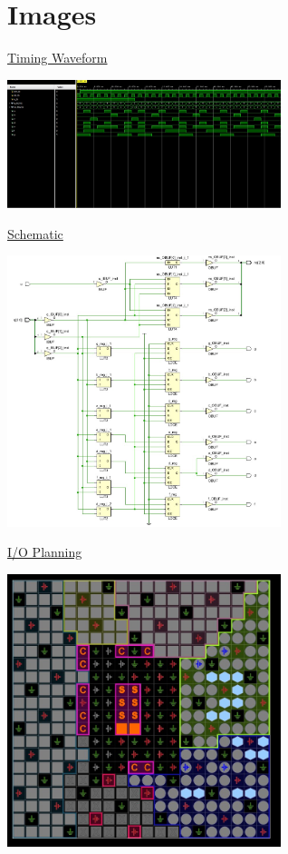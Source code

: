 \documentclass[11pt]{article}
\begin{document}
\newpage
\rmfamily
\section{Images}

\begin{center}
    \underline{Timing Waveform}

    \includegraphics[width = 0.6\textwidth]{timingdiag.jpg}

    \underline{Schematic}

    \includegraphics[width = 0.6\textwidth]{schematic.jpg}

    \newpage

    \underline{I/O Planning}

    \includegraphics[width = 0.6\textwidth]{ioplanning.jpg}


\end{center}
\end{document}
